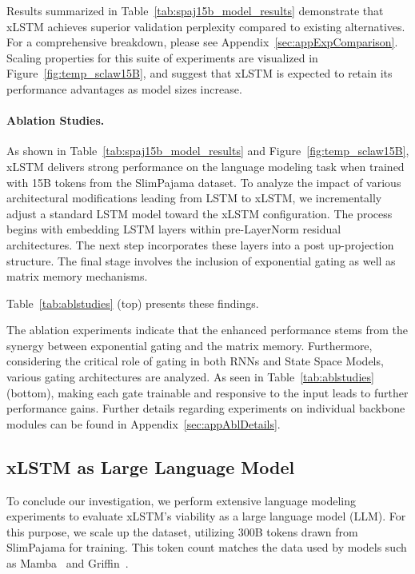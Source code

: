 Results summarized in Table~\ref{tab:spaj15b_model_results} demonstrate that xLSTM achieves superior validation perplexity compared to existing alternatives. For a comprehensive breakdown, please see Appendix~\ref{sec:appExpComparison}. Scaling properties for this suite of experiments are visualized in Figure~\ref{fig:temp_sclaw15B}, and suggest that xLSTM is expected to retain its performance advantages as model sizes increase.

\paragraph{Ablation Studies.}
As shown in Table~\ref{tab:spaj15b_model_results} and Figure~\ref{fig:temp_sclaw15B}, xLSTM delivers strong performance on the language modeling task when trained with 15B tokens from the SlimPajama dataset. To analyze the impact of various architectural modifications leading from LSTM to xLSTM, we incrementally adjust a standard LSTM model toward the xLSTM configuration. The process begins with embedding LSTM layers within pre-LayerNorm residual architectures. The next step incorporates these layers into a post up-projection structure. The final stage involves the inclusion of exponential gating as well as matrix memory mechanisms.

Table~\ref{tab:ablstudies} (top) presents these findings.

The ablation experiments indicate that the enhanced performance stems from the synergy between exponential gating and the matrix memory. Furthermore, considering the critical role of gating in both RNNs and State Space Models, various gating architectures are analyzed. As seen in Table~\ref{tab:ablstudies} (bottom), making each gate trainable and responsive to the input leads to further performance gains. Further details regarding experiments on individual backbone modules can be found in Appendix~\ref{sec:appAblDetails}.

\subsection{xLSTM as Large Language Model}
\label{sec:ExpLanguage}

To conclude our investigation, we perform extensive language modeling experiments to evaluate xLSTM's viability as a large language model (LLM). For this purpose, we scale up the dataset, utilizing 300B tokens drawn from SlimPajama for training. This token count matches the data used by models such as Mamba~\citep{Gu:24arxiv} and Griffin~\citep{De:24arxiv}.

